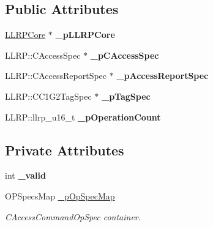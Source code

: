 \subsection*{Public Attributes}
\begin{DoxyCompactItemize}
\item 
\hypertarget{class_e_l_f_i_n_1_1_access_operation_a6b116c469b2c6d8bed6d8436cfa9ed4b}{\hyperlink{class_e_l_f_i_n_1_1_l_l_r_p_core}{L\-L\-R\-P\-Core} $\ast$ {\bfseries \-\_\-p\-L\-L\-R\-P\-Core}}\label{class_e_l_f_i_n_1_1_access_operation_a6b116c469b2c6d8bed6d8436cfa9ed4b}

\item 
\hypertarget{class_e_l_f_i_n_1_1_access_operation_aff207b159e862557b1c9b56a377dd8bf}{L\-L\-R\-P\-::\-C\-Access\-Spec $\ast$ {\bfseries \-\_\-p\-C\-Access\-Spec}}\label{class_e_l_f_i_n_1_1_access_operation_aff207b159e862557b1c9b56a377dd8bf}

\item 
\hypertarget{class_e_l_f_i_n_1_1_access_operation_a68385342f946fc8d8815e13b26c05297}{L\-L\-R\-P\-::\-C\-Access\-Report\-Spec $\ast$ {\bfseries \-\_\-p\-Access\-Report\-Spec}}\label{class_e_l_f_i_n_1_1_access_operation_a68385342f946fc8d8815e13b26c05297}

\item 
\hypertarget{class_e_l_f_i_n_1_1_access_operation_af20d9e59c1a139f459f8e6c250d7941c}{L\-L\-R\-P\-::\-C\-C1\-G2\-Tag\-Spec $\ast$ {\bfseries \-\_\-p\-Tag\-Spec}}\label{class_e_l_f_i_n_1_1_access_operation_af20d9e59c1a139f459f8e6c250d7941c}

\item 
\hypertarget{class_e_l_f_i_n_1_1_access_operation_ad1b50641846c7dcb2186865362f782f6}{L\-L\-R\-P\-::llrp\-\_\-u16\-\_\-t {\bfseries \-\_\-p\-Operation\-Count}}\label{class_e_l_f_i_n_1_1_access_operation_ad1b50641846c7dcb2186865362f782f6}

\end{DoxyCompactItemize}
\subsection*{Private Attributes}
\begin{DoxyCompactItemize}
\item 
\hypertarget{class_e_l_f_i_n_1_1_access_operation_aa51669c1cb4631a793c505b8797450ad}{int {\bfseries \-\_\-valid}}\label{class_e_l_f_i_n_1_1_access_operation_aa51669c1cb4631a793c505b8797450ad}

\item 
O\-P\-Specs\-Map \hyperlink{class_e_l_f_i_n_1_1_access_operation_ac62e4350f2fa25abff5ffa61ac853a90}{\-\_\-p\-Op\-Spec\-Map}
\begin{DoxyCompactList}\small\item\em C\-Access\-Command\-Op\-Spec container. \end{DoxyCompactList}\end{DoxyCompactItemize}


